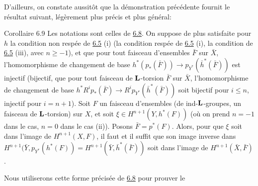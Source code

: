 \documentclass[10pt]{../fichiers-configuration-latex/smfart}
\begin{document}
D'ailleurs, on constate aussitôt que la démonstration précédente
fournit le résultat suivant, légèrement plus précis et plus général:

\begin{enonce*}{Corollaire 6.9}
Les notations sont celles de \hyperref[XII.prop6.8]{6.8}. On suppose de plus satisfaite pour
$h$ la condition non respée de \hyperref[XII.prop6.5]{6.5} {\rm(i)} (\resp la condition
respée de \hyperref[XII.prop6.5]{6.5} {\rm(i)}, \resp la condition de {\rm \hyperref[XII.prop6.5]{6.5} 
(iii)}, avec
$n\geq -1$), et que pour tout faisceau d'ensembles $\bar{F}$ sur
$\bar{X}$, l'homomorphisme de changement de base
$h^{\ast}(p_{\ast}(\bar{F}))\rightarrow
p_{Y^{\ast}}(\bar{h}^{\ast}(\bar{F}))$ est injectif (\resp bijectif,
\resp que pour tout faisceau de $\mathbf{L}$-torsion $\bar{F}$ sur
$\bar{X}$, l'homomorphisme de changement de base
$h^{\ast}R^{i}p_{\ast}(\bar{F})\rightarrow
R^{i}p_{Y^{\ast}}(\bar{h}^{\ast}(\bar{F}))$ soit bijectif pour $i\leq
n$, injectif pour $i=n+1$). Soit $F$ un faisceau d'ensembles (\resp de
ind-$\mathbf{L}$-groupes, \resp un faisceau de $\mathbf{L}$-torsion)
sur $X$, et soit $\xi \in H^{n+1}(Y,h^{\ast}(F))$ (où on prend $n=-1$
dans le cas, $n=0$ dans le cas {\rm(ii)}). Posons
$\bar{F}=p^{\ast}(F)$. Alors, pour que $\xi$ soit dans l'image de
$H^{n+1}(X,F)$, il faut et il suffit que son image inverse dans
$H^{n+1}(\bar{Y},p_{Y^{\ast}}(h^{\ast}(F))=H^{n+1}(\bar{Y},\bar{h}^{\ast}(\bar{F}))$ 
soit dans l'image de $H^{n+1}(\bar{X},\bar{F})$.
\end{enonce*}

Nous utiliserons cette forme précisée de \hyperref[XII.prop6.8]{6.8} pour prouver le
\end{document}
